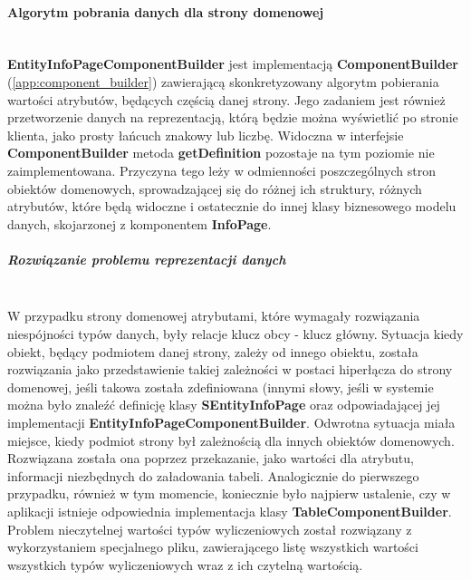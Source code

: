 	\paragraph{Algorytm pobrania danych dla strony domenowej} \hspace{0pt} \\
	\textbf{EntityInfoPageComponentBuilder} jest implementacją \textbf{ComponentBuilder} (\ref{app:component_builder}) zawierającą skonkretyzowany algorytm pobierania wartości atrybutów, będących częścią danej strony. Jego zadaniem jest również przetworzenie danych na reprezentacją, którą będzie można wyświetlić po stronie klienta, jako prosty łańcuch znakowy lub liczbę. Widoczna w interfejsie \textbf{ComponentBuilder} metoda \textbf{getDefinition} pozostaje na tym poziomie nie zaimplementowana. Przyczyna tego leży w odmienności poszczególnych stron obiektów domenowych, sprowadzającej się do różnej ich struktury, różnych atrybutów, które będą widoczne i ostatecznie do innej klasy biznesowego modelu danych, skojarzonej z komponentem \textbf{InfoPage}.
	
	\subparagraph{Rozwiązanie problemu reprezentacji danych} \hspace{0pt} \\
	W przypadku strony domenowej atrybutami, które wymagały rozwiązania niespójności typów danych, były relacje klucz obcy - klucz główny. Sytuacja kiedy obiekt, będący podmiotem danej strony, zależy od innego obiektu, została rozwiązania jako przedstawienie takiej zależności w postaci hiperłącza do strony domenowej, jeśli takowa została zdefiniowana (innymi słowy, jeśli w systemie można było znaleźć definicję klasy \textbf{SEntityInfoPage} oraz odpowiadającej jej implementacji \textbf{EntityInfoPageComponentBuilder}. Odwrotna sytuacja miała miejsce, kiedy podmiot strony był zależnością dla innych obiektów domenowych. Rozwiązana została ona poprzez przekazanie, jako wartości dla atrybutu, informacji niezbędnych do załadowania tabeli. Analogicznie do pierwszego przypadku, również w tym momencie, koniecznie było najpierw ustalenie, czy w aplikacji istnieje odpowiednia implementacja klasy \textbf{TableComponentBuilder}.
	Problem nieczytelnej wartości typów wyliczeniowych został rozwiązany z wykorzystaniem specjalnego pliku, zawierającego listę wszystkich wartości wszystkich typów wyliczeniowych wraz z ich czytelną wartością. 
	 
	
